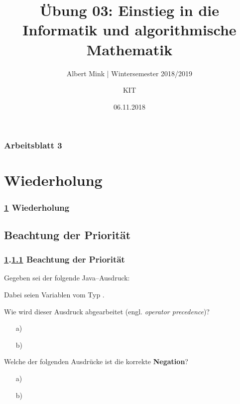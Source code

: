 \documentclass[c,18pt]{beamer}
\date{06.11.2018}
\title[Übung 03: Einstieg in die Informatik und algorithmische]
  {Übung 03: Einstieg in die Informatik und algorithmische \\ Mathematik}
\subtitle{Albert Mink | Wintersemester 2018/2019}
\author[Albert Mink, ]{KIT}
\institute[Institut für Angewandte und Numerische Mathematik (IANM)]{Institut für Angewandte und Numerische Mathematik}
\begin{document}
\begin{frame}
  \maketitle
\end{frame}


\begin{frame}
  \frametitle{Arbeitsblatt 3}%
\tableofcontents[hideallsubsections]
\end{frame}
\setcounter{exercise}{8}



\section{Wiederholung}\label{K:wdh}
\begin{frame}
  \frametitle{\ref{K:wdh} Wiederholung}%
\tableofcontents[current]
\end{frame}


\def\stitle{Beachtung der Priorität}
\subsection{\stitle}\label{S:Prioritat}
\begin{frame}[fragile]%
  \frametitle{\ref{K:wdh}.\ref{S:Prioritat} \stitle}%
\medskip

Gegeben sei der folgende Java--Ausdruck:
\begin{center}
\end{center}
Dabei seien  Variablen vom Typ .
\medskip

Wie wird dieser Ausdruck abgearbeitet (engl. \emph{operator precedence})?
\begin{itemize}
  \item [a)] 
  \item[b)] 
\end{itemize}

Welche der folgenden Ausdrücke ist die korrekte \textbf{Negation}?
\begin{itemize}
  \item [a)] 
  \item [b)] 
\end{itemize}

\end{frame}
\end{document}
